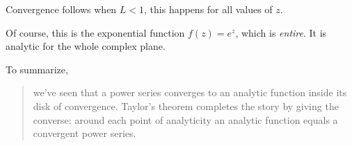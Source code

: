 \documentclass[11pt, oneside]{article}
\begin{document}
Convergence follows when $L < 1$, this happens for all values of $z$.

Of course, this is the exponential function $f(z) = e^z$, which is \emph{entire}.  It is analytic for the whole complex plane.

To summarize, 

\begin{quote}we've seen that a power series converges to an analytic function inside its disk of convergence. Taylor’s theorem completes the story by giving the converse: around each point of analyticity an analytic function equals a convergent power series.\end{quote}
\end{document}
